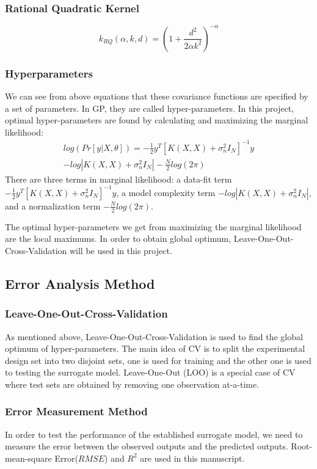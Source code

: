 \documentclass[conference]{IEEEtran}
\begin{document}
\subsubsection*{Rational Quadratic Kernel} 
\begin{equation}
  k_{RQ}(\alpha,k,d) =(1+\frac{d^2}{2\alpha k^2})^{-\alpha}
\end{equation}
\subsubsection{Hyperparameters}
We can see from above equations that these covariance functions are specified by a set of parameters. In GP, they are called hyper-parameters. In this project, optimal hyper-parameters are found by calculating and maximizing the marginal likelihood\cite{mackay2003information}:
\begin{multline}
  log (Pr[y|X,\theta]) = -\frac{1}{2} y^T[K(X,X)+\sigma_n^2 I_N]^{-1}y \\ - log|K(X,X)+ \sigma_n^2 I_N|- \frac{N}{2}log(2\pi)
\end{multline}
There are three terms in marginal likelihood\cite{rasmussen2004gaussian}: a data-fit term
  $-\frac{1}{2} y^T[K(X,X)+\sigma_n^2 I_N]^{-1}y$, a model complexity term $ - log|K(X,X)+ \sigma_n^2 I_N|$, and a normalization term $-\frac{N}{2}log(2\pi)$.
 
The optimal hyper-parameters we get from maximizing the marginal likelihood are the local maximums. In order to obtain global optimum, Leave-One-Out-Cross-Validation will be used in this project\cite{le2013multi}\cite{bouhlel2016optimisation}.

\subsection{Error Analysis Method}
\subsubsection{Leave-One-Out-Cross-Validation}
As mentioned above, Leave-One-Out-Cross-Validation is used to find the global optimum of hyper-parameters. The main idea of CV is to split the experimental design set into two disjoint sets, one is used for training and the other one is used to testing the surrogate model. Leave-One-Out (LOO) is a special case of CV where test sets are obtained by removing one observation at-a-time.
\subsubsection{Error Measurement Method}
In order to test the performance of the established surrogate model, we need to measure the error between the observed outputs and the predicted outputs. Root-mean-square Error($RMSE$) and $R^2$ are used in this manuscript.
\end{document}

